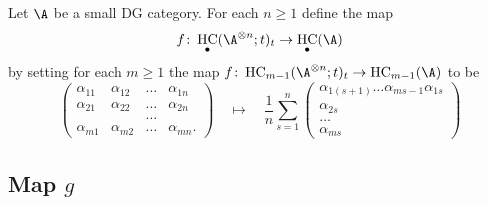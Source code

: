 \documentclass[12pt,a4paper,reqno]{amsart}
\DeclareMathOperator{\hochcx}{{HC}}
\begin{document}
\begin{defn}
\label{defn-the-map-f}
Let $\A$ be a small DG category. 
For each $n \geq 1$ define the map 
$$ f \colon 
\hochcx_\bullet(\A^{\otimes n};t)_t
\rightarrow 
\hochcx_\bullet(\A)
$$
by setting for each $m \geq 1$ the map 
$f \colon 
\hochcx_{m-1}(\A^{\otimes n};t)_t
\rightarrow 
\hochcx_{m-1}(\A)$ to be
\begin{equation}
\label{eqn-quasi-iso-f-long-cycle}
\begin{pmatrix}
\alpha_{11} & \alpha_{12} & \dots & \alpha_{1n}  
\\
\alpha_{21} & \alpha_{22} & \dots & \alpha_{2n}  
\\
& & \dots & 
\\
\alpha_{m1} & \alpha_{m2} & \dots & \alpha_{mn}. 
\end{pmatrix} 
\quad \mapsto \quad 
\frac{1}{n}
\sum_{s = 1}^n
\begin{pmatrix}
\alpha_{1(s+1)} \dots \alpha_{m{s-1}}\alpha_{1s} \\
\alpha_{2s} \\
\dots
\\
\alpha_{ms} 
\end{pmatrix}
\end{equation}
 
\end{defn}

\subsection{Map $g$}
\label{section-map-g}
\end{document}
